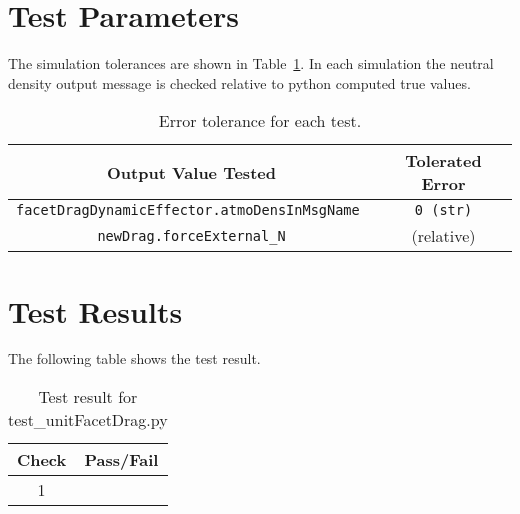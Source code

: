 \section{Test Parameters}
The simulation tolerances are shown in Table~\ref{tab:errortol}.  In each simulation the neutral density output message is checked relative to python computed true values.  
\begin{table}[htbp]
	\caption{Error tolerance for each test.}
	\label{tab:errortol}
	\centering \fontsize{10}{10}\selectfont
	\begin{tabular}{ c | c } %
		\hline\hline
		\textbf{Output Value Tested}  & \textbf{Tolerated Error}  \\ 
		\hline
		{\tt facetDragDynamicEffector.atmoDensInMsgName }       & {\tt 0 (str)}   \\
		{\tt newDrag.forceExternal\_N}        &  (relative)   \\ 		\hline\hline
	\end{tabular}
\end{table}




\section{Test Results}
The following table shows the test result.


\begin{table}[H]
	\caption{Test result for test\_unitFacetDrag.py}
	\label{tab:results}
	\centering \fontsize{10}{10}\selectfont
	\begin{tabular}{c  | c } %
		\hline\hline
		\textbf{Check} &  \textbf{Pass/Fail} \\ 
		\hline
		1 &   \\ 
		\hline
		\hline
	\end{tabular}
\end{table}



